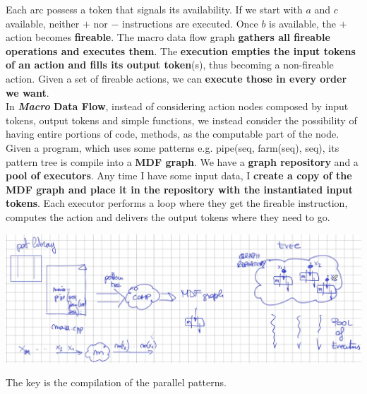 \documentclass[10pt]{report}
\begin{document}
Each arc possess a token that signals its availability. If we start with $a$ and $c$ available, neither $+$ nor $-$ instructions are executed. Once $b$ is available, the $+$ action becomes \textbf{fireable}. The macro data flow graph \textbf{gathers all fireable operations and executes them}. The \textbf{execution empties the input tokens of an action and fills its output token}(s), thus becoming a non-fireable action. Given a set of fireable actions, we can \textbf{execute those in every order we want}.\\
In \textbf{\textit{Macro} Data Flow}, instead of considering action nodes composed by input tokens, output tokens and simple functions, we instead consider the possibility of having entire portions of code, methods, as the computable part of the node. Given a program, which uses some patterns e.g. pipe(seq, farm(seq), seq), its pattern tree is compile into a \textbf{MDF graph}. We have a \textbf{graph repository} and a \textbf{pool of executors}. Any time I have some input data, I \textbf{create a copy of the MDF graph and place it in the repository with the instantiated input tokens}. Each executor performs a loop where they get the fireable instruction, computes the action and delivers the output tokens where they need to go.
\begin{center}
	\includegraphics[scale=0.4]{30.png}
\end{center}
The key is the compilation of the parallel patterns.
\end{document}
